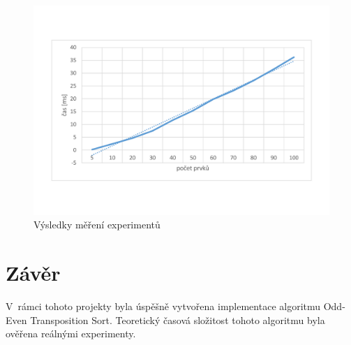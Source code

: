 \documentclass[a4paper, 10pt, twocolumn]{article}
\begin{document}
    \begin{figure}[ht]
        \centering
        \includegraphics[width=1 \linewidth]{img/experiments.pdf}
        \caption{Výsledky měření experimentů}
		\label{fig:experiments}
    \end{figure}


    \section{Závěr}

    V~rámci tohoto projekty byla úspěšně vytvořena implementace algoritmu
    Odd-Even Transposition Sort. Teoretický časová složitost tohoto
    algoritmu byla ověřena reálnými experimenty.
\end{document}
